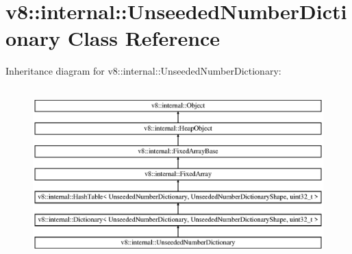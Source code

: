 \hypertarget{classv8_1_1internal_1_1_unseeded_number_dictionary}{}\section{v8\+:\+:internal\+:\+:Unseeded\+Number\+Dictionary Class Reference}
\label{classv8_1_1internal_1_1_unseeded_number_dictionary}
Inheritance diagram for v8\+:\+:internal\+:\+:Unseeded\+Number\+Dictionary\+:\begin{figure}[H]
\begin{center}
\leavevmode
\includegraphics[height=6.689420cm]{classv8_1_1internal_1_1_unseeded_number_dictionary}
\end{center}
\end{figure}
